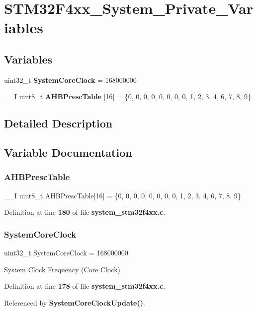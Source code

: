 \section{S\+T\+M32\+F4xx\+\_\+\+System\+\_\+\+Private\+\_\+\+Variables}
\label{group__STM32F4xx__System__Private__Variables}
\subsection*{Variables}
\begin{DoxyCompactItemize}
\item 
uint32\+\_\+t \textbf{ System\+Core\+Clock} = 168000000
\item 
\+\_\+\+\_\+I uint8\+\_\+t \textbf{ A\+H\+B\+Presc\+Table} [16] = \{0, 0, 0, 0, 0, 0, 0, 0, 1, 2, 3, 4, 6, 7, 8, 9\}
\end{DoxyCompactItemize}


\subsection{Detailed Description}


\subsection{Variable Documentation}
\mbox{\label{group__STM32F4xx__System__Private__Variables_gacdc3ef54c0704c90e69a8a84fb2d970d}} 
\subsubsection{A\+H\+B\+Presc\+Table}
{\footnotesize\ttfamily \+\_\+\+\_\+I uint8\+\_\+t A\+H\+B\+Presc\+Table[16] = \{0, 0, 0, 0, 0, 0, 0, 0, 1, 2, 3, 4, 6, 7, 8, 9\}}



Definition at line \textbf{ 180} of file \textbf{ system\+\_\+stm32f4xx.\+c}.

\mbox{\label{group__STM32F4xx__System__Private__Variables_gaa3cd3e43291e81e795d642b79b6088e6}} 
\subsubsection{System\+Core\+Clock}
{\footnotesize\ttfamily uint32\+\_\+t System\+Core\+Clock = 168000000}

System Clock Frequency (Core Clock) 

Definition at line \textbf{ 178} of file \textbf{ system\+\_\+stm32f4xx.\+c}.



Referenced by \textbf{ System\+Core\+Clock\+Update()}.

